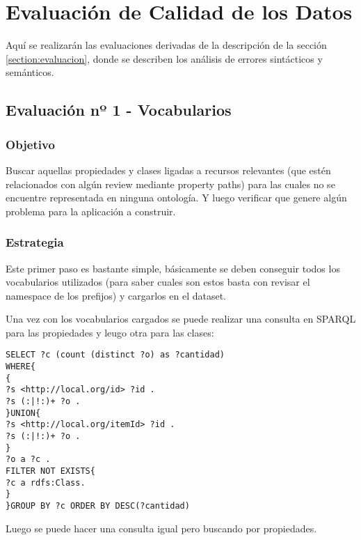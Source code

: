 \chapter{Evaluación de Calidad de los Datos}
\label{chapter:evaluacion}

Aquí se realizarán las evaluaciones derivadas de la descripción de la sección \ref{section:evaluacion}, 
donde se describen los análisis de errores sintácticos y semánticos.

\section{Evaluación nº 1 - Vocabularios}
\label{section:evaluacion-vocabularios}

\subsection*{Objetivo}
Buscar aquellas propiedades y clases ligadas a recursos relevantes (que estén relacionados con algún review mediante property paths) 
para las cuales no se encuentre representada en ninguna ontología. Y luego verificar que genere algún problema para la aplicación a construir.

\subsection*{Estrategia}
Este primer paso es bastante simple, básicamente se deben conseguir todos los vocabularios utilizados (para saber cuales son estos basta con revisar el namespace 
de los prefijos) y cargarlos en el dataset.

Una vez con los vocabularios cargados se puede realizar una consulta en SPARQL para las propiedades y leugo otra para las clases:

\begin{lstlisting}[frame=single]
SELECT ?c (count (distinct ?o) as ?cantidad)
WHERE{
{
?s <http://local.org/id> ?id .
?s (:|!:)+ ?o .
}UNION{
?s <http://local.org/itemId> ?id .
?s (:|!:)+ ?o .
}
?o a ?c .
FILTER NOT EXISTS{
?c a rdfs:Class.
}
}GROUP BY ?c ORDER BY DESC(?cantidad)
\end{lstlisting}

\noindent Luego se puede hacer una consulta igual pero buscando por propiedades.

